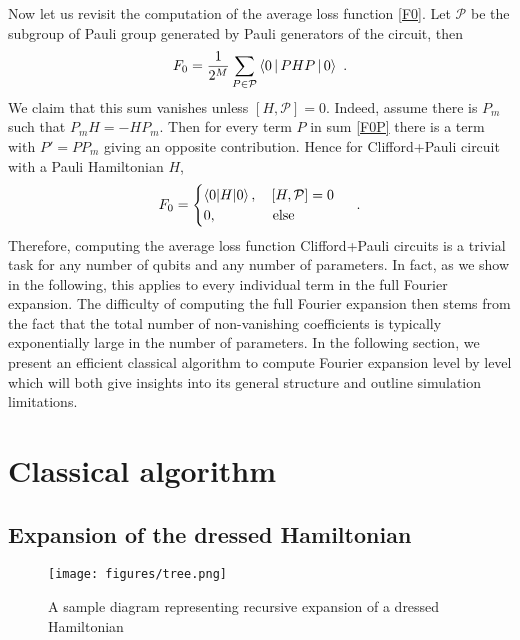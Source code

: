 \documentclass[twocolumn, amsfonts, amssymb, aps, nofootinbib]{revtex4-2}
\newcommand{\CP}{Clifford+Pauli}
\begin{document}
Now let us revisit the computation of the average loss function \eqref{F0}. Let $\mathcal{P}$ be the subgroup of Pauli group generated by Pauli generators of the circuit, then
\begin{align}
	F_0=\frac{1}{2^M}\sum_{P\in \mathcal{P}}\Braket{0|PHP|0} \ . \label{F0P}
\end{align}
We claim that this sum vanishes unless $[H, \mathcal{P}]=0$. Indeed, assume there is $P_m$ such that $P_mH=-HP_m$. Then for every term $P$ in sum \eqref{F0P} there is a term with $P'=PP_m$ giving an opposite contribution. Hence for \CP{} circuit with a Pauli Hamiltonian $H$,
\begin{align}
	F_0=\begin{cases} \braket{0|H|0},\quad [H, \mathcal{P}] = 0\\ 0,\qquad\qquad \text{else}\end{cases} \ .
\end{align}
Therefore, computing the average loss function \CP{} circuits is a trivial task for any number of qubits and any number of parameters. In fact, as we show in the following, this applies to every individual term in the full Fourier expansion. The difficulty of computing the full Fourier expansion then stems from the fact that the total number of non-vanishing coefficients is typically exponentially large in the number of parameters. In the following section, we present an efficient classical algorithm to compute Fourier expansion level by level which will both give insights into its general structure and outline simulation limitations.

\section{Classical algorithm}
\subsection{Expansion of the dressed Hamiltonian}
\begin{figure}
	\texttt{[image: figures/tree.png]}
	\caption{A sample diagram representing recursive expansion of a dressed Hamiltonian}
	\label{fig tree}
\end{figure}
\end{document}
